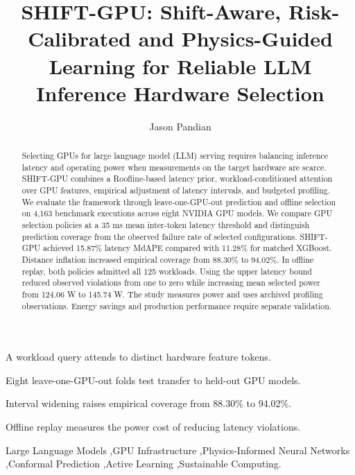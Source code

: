 \documentclass[preprint,12pt]{elsarticle}
\begin{document}
\begin{frontmatter}

\title{SHIFT-GPU: Shift-Aware, Risk-Calibrated and Physics-Guided Learning for Reliable LLM Inference Hardware Selection}

\author[inst1]{Jason Pandian}



\begin{abstract}
Selecting GPUs for large language model (LLM) serving requires balancing
inference latency and operating power when measurements on the target
hardware are scarce. SHIFT-GPU combines a Roofline-based latency prior,
workload-conditioned attention over GPU features, empirical adjustment
of latency intervals, and budgeted profiling. We evaluate the framework
through leave-one-GPU-out prediction and offline selection on 4,163
benchmark executions across eight NVIDIA GPU models. We compare GPU
selection policies at a 35 ms mean inter-token latency threshold and
distinguish prediction coverage from the observed failure rate of
selected configurations. SHIFT-GPU achieved 15.87\% latency MdAPE
compared with 11.28\% for matched XGBoost. Distance inflation increased
empirical coverage from 88.30\% to 94.02\%. In offline replay, both
policies admitted all 125 workloads. Using the upper latency bound
reduced observed violations from one to zero while increasing mean
selected power from 124.06 W to 145.74 W. The study measures power and
uses archived profiling observations. Energy savings and production
performance require separate validation.
\end{abstract}
\begin{highlights}

\item
  A workload query attends to distinct hardware feature tokens.
\item
  Eight leave-one-GPU-out folds test transfer to held-out GPU models.
\item
  Interval widening raises empirical coverage from 88.30\% to 94.02\%.
\item
  Offline replay measures the power cost of reducing latency violations.
\end{highlights}
\begin{keyword}
Large Language Models \sep GPU Infrastructure \sep Physics-Informed Neural Networks \sep Conformal Prediction \sep Active Learning \sep Sustainable Computing.
\end{keyword}

\end{frontmatter}
\end{document}
